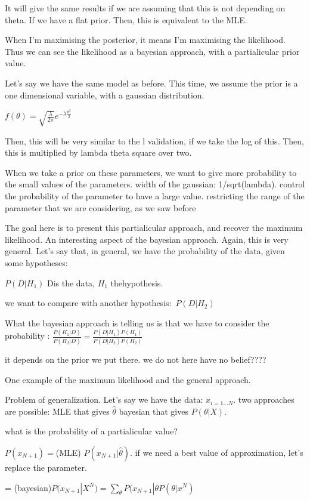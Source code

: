 \documentclass[a4paper]{tufte-book}
\begin{document}
It will give the same results if we are assuming that this is not depending on theta. If we have a flat prior.
Then, this is equivalent to the MLE.

When I'm maximising the posterior, it means I'm maximising the likelihood.
Thus we can see the likelihood as a bayesian approach, with a partialicular prior
value.

Let's say we have the same model as before. This time, we assume the prior is
a one dimensional variable, with a gaussian distribution.

$f(\theta)  = \sqrt{\frac{\lambda}{2\pi}} e^{-\lambda \frac{\theta^2}{2}}$

Then, this will be very similar to the l validation, if we take the log of this.
Then, this is multiplied by lambda theta square over two.

When we take a prior on these parameters, we want to give more probability to
the small values of the parameters. width of the gaussian: 1/sqrt(lambda).
control the probability of the parameter to have a large value.
restricting the range of the parameter that we are considering, as we saw before

The goal here is to present this partialicular approach, and recover the maximum
likelihood.
An interesting aspect of the bayesian approach. Again, this is very general.
Let's say that, in general, we have the probability of the data, given some
hypotheses:

$P(D|H_1)$
Dis the data, $H_1$ thehypothesis.

we want to compare with another hypothesis: $P(D|H_2)$

What the bayesian approach is telling us is that we have to consider the
probability :
$\frac{P(H_1|D)}{P(H_2|D)} = \frac{P(D|H_1)P(H_1)}{P(D|H_2)P(H_2)}$

it depends on the prior we put there. we do not here have no belief????

One example of the maximum likelihood and the general approach.

Problem of generalization.
Let's say we have the data:
$x_{i=1\ldots N}$. two approaches are possible:
MLE that gives $\hat\theta$
bayesian that gives $P(\theta|X)$.

what is the probability of a partialicular value?

$P(x_{N+1}) = $(MLE) $P(x_{N+1}|\hat\theta)$. if we need a best value of approximation, let's replace the parameter.

= (bayesian)$ P(x_{N+1} | X^N) = \sum_\theta P(x_{N+1}|\theta P(\theta |x^N)$
\end{document}
